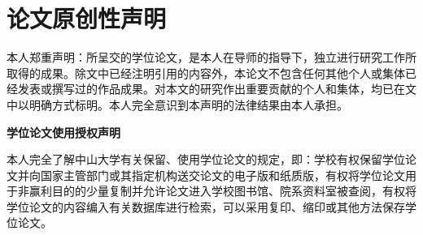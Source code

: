 {%

\clearpage
{}
\chapter*{\centering\sanhao\song\bfseries 论文原创性声明}
\song{}
本人郑重声明：所呈交的学位论文，是本人在导师的指导下，独立进行研究工作所取得的成果。除文中已经注明引用的内容外，本论文不包含任何其他个人或集体已经发表或撰写过的作品成果。对本文的研究作出重要贡献的个人和集体，均已在文中以明确方式标明。本人完全意识到本声明的法律结果由本人承担。

\vspace*{40pt}
\begin{flushright}
\setlength{\@title@width}{5cm}
  {\sihao{}
 }
\end{flushright}

\vspace*{60pt}
\begin{center}
  \sanhao\song\bfseries{学位论文使用授权声明}
\end{center}

\song{}
本人完全了解中山大学有关保留、使用学位论文的规定，即：学校有权保留学位论文并向国家主管部门或其指定机构送交论文的电子版和纸质版，有权将学位论文用于非赢利目的的少量复制并允许论文进入学校图书馆、院系资料室被查阅，有权将学位论文的内容编入有关数据库进行检索，可以采用复印、缩印或其他方法保存学位论文。

\vspace*{40pt}
\begin{flushright}
\setlength{\@title@width}{5cm}
  {\sihao{}
 }
\end{flushright}
\thispagestyle{empty}   %

}

